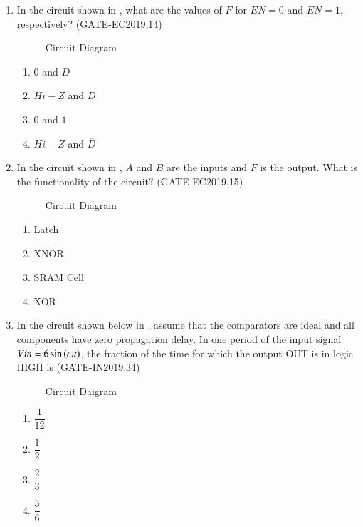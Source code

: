 \begin{enumerate}[label=\arabic*.,ref=\theenumi]
\item In the circuit shown
	in ,
	what are the values of $F$ for $EN=0$ and $EN=1$,  respectively?
 \hfill(GATE-EC2019,14)  

\begin{figure}[H]
    \centering
    \resizebox{0.75\columnwidth}{!}{%
    
	}
    \caption{Circuit Diagram}
	\label{fig:GATE-EC2019,14} 
\end{figure}
\begin{enumerate}
    \item $0$ and $D$
    \item $Hi-Z$ and $D$
    \item $0$ and $1$
    \item $Hi-Z$ and $\overline{D}$
\end{enumerate}
\item In the circuit shown
	   in ,
	$A$ and $B$ are the inputs and $F$ is the output. What is the functionality of the circuit?
           \hfill(GATE-EC2019,15)
           
\begin{figure}[H]
\centering
\resizebox{0.5\columnwidth}{!}{%

	}
\caption{Circuit Diagram}
	   \label{fig:GATE-EC2019,15}
\end{figure}
\begin{enumerate}
\item Latch
\item XNOR
\item SRAM Cell
\item XOR
\end{enumerate}

\item In the circuit shown below in 
	    ,
	 assume that the comparators are ideal and all components have zero propagation delay. In one period of the input signal $Vin=6\sin\left(\omega t\right)$, the fraction of the time for which the output OUT is in logic HIGH is 
		                 \hfill(GATE-IN2019,34)
\begin{figure}[H]
\centering
\resizebox{0.75\columnwidth}{!}{%
    
	}
	    \caption{Circuit Daigram}
	    \label{fig:GATE-IN2019,34}
     \end{figure}
\begin{enumerate}
	\item $\dfrac{1}{12}$
	\item $\dfrac{1}{2}$
	\item $\dfrac{2}{3}$
	\item $\dfrac{5}{6}$
\end{enumerate}



\end{enumerate}
